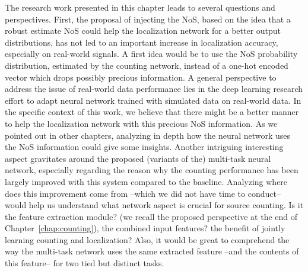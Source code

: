 The research work presented in this chapter leads to several questions and perspectives. First, the proposal of injecting the NoS, based on the idea that a robust estimate NoS could help the localization network for a better output distributions, has not led to an important increase in localization accuracy, especially on real-world signals. A first idea would be to use the NoS probability distribution, estimated by the counting network, instead of a one-hot encoded vector which drops possibly precious information. A general perspective to address the issue of real-world data performance lies in the deep learning research effort to adapt neural network trained with simulated data on real-world data. In the specific context of this work, we believe that there might be a better manner to help the localization network with this precious NoS information. As we pointed out in other chapters, analyzing in depth how the neural network uses the NoS information could give some insights. Another intriguing interesting aspect gravitates around the proposed (variants of the) multi-task neural network, especially regarding the reason why the counting performance has been largely improved with this system compared to the baseline. Analyzing where does this improvement come from --which we did not have time to conduct-- would help us understand what network aspect is crucial for source counting. Is it the feature extraction module? (we recall the proposed perspective at the end of Chapter~\ref{chap:counting}), the combined input features? the benefit of jointly learning counting and localization? Also, it would be great to comprehend the way the multi-task network uses the same extracted feature --and the contents of this feature-- for two tied but distinct tasks.
